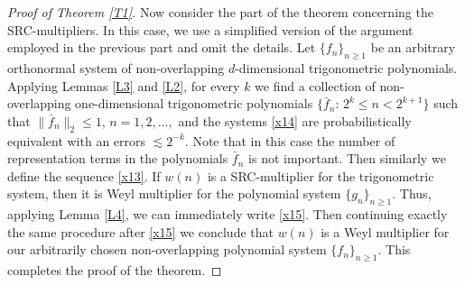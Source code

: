 \documentclass[12pt,reqno,fleqn]{amsart}
\theoremstyle{plain} %
\theoremstyle{remark}
\theoremstyle{plain}
\numberwithin{equation}{section}
\newcommand {\e }[1]{\eqref{#1}}
\newcommand {\lem }[1]{Lemma \ref{#1}}
\newcommand {\trm }[1]{Theorem \ref{#1}}
\begin{document}
\begin{proof}[Proof of \trm{T1}]
Now consider the part of the theorem concerning the SRC-multipliers. In this case, we use a simplified version of the argument employed in the previous part and omit the details. Let $\{f_n\}_{n\ge 1}$ be an arbitrary orthonormal system of non-overlapping $d$-dimensional trigonometric polynomials.  Applying Lemmas \ref{L3} and \ref{L2}, for every $k$ we find a collection of non-overlapping one-dimensional trigonometric polynomials $ \{\bar f_n:\, 2^k\le n< 2^{k+1}\}$ such that $\|\bar f_n\|_2\le 1$,  $n=1,2,\ldots,$ and the systems \e{x14}
are  probabilistically equivalent with an errors $\lesssim 2^{-k}$. Note that in this case the number of representation terms in the polynomials $\bar f_n$ is not important.
Then similarly we define the sequence \e{x13}. If $w(n)$ is a SRC-multiplier for the trigonometric system, then it is Weyl multiplier for the polynomial system $\{g_n\}_{n\ge 1}$. Thus, applying \lem{L4}, we can immediately write \e{x15}. Then continuing exactly the same procedure after \e{x15} we conclude that $w(n)$ is a Weyl multiplier for our arbitrarily chosen non-overlapping polynomial system $\{f_n\}_{n\ge 1}$. This completes the proof of the theorem.
\end{proof}
\end{document}
